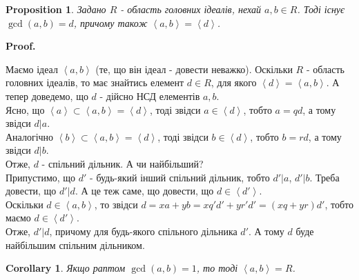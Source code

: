 \documentclass[a4paper, 10pt]{article}
\makeatletter
\theoremstyle{theoremdd}
\theoremstyle{theoremdd}
\newtheorem{definition}[theorem]{Definition}
\theoremstyle{theoremdd}
\theoremstyle{theoremdd}
\theoremstyle{theoremdd}
\newtheorem{proposition}[theorem]{Proposition}
\theoremstyle{theoremdd}
\theoremstyle{theoremdd}
\theoremstyle{theoremdd}
\newtheorem{corollary}[theorem]{Corollary}
\renewenvironment{proof}[1][Proof.\\]{\par
\pushQED{\hfill \qed}%
\normalfont \topsep6\p@\@plus6\p@\relax
\trivlist
\item\relax
{\bfseries
#1\@addpunct{.}}\hspace\labelsep\ignorespaces
}{%
\popQED\endtrivlist\@endpefalse
}
\makeatother
\begin{document}

\begin{proposition}
Задано $R$ - область головних ідеалів, нехай $a,b \in R$. Тоді існує $\gcd(a,b) = d$, причому також $\left<a,b\right> = \left<d\right>$.
\end{proposition}

\begin{proof}
Маємо ідеал $\left<a,b \right>$ (те, що він ідеал - довести неважко). Оскільки $R$ - область головних ідеалів, то має знайтись елемент $d \in R$, для якого $\left<d \right> = \left<a,b\right>$. А тепер доведемо, що $d$ - дійсно НСД елементів $a,b$.\\
Ясно, що $\left< a \right> \subset \left<a,b \right> = \left< d \right>$, тоді звідси $a \in \left< d \right>$, тобто $a = qd$, а тому звідси $d | a$.\\
Аналогічно $\left< b \right> \subset \left<a,b \right> = \left< d \right>$, тоді звідси $b \in \left< d \right>$, тобто $b = rd$, а тому звідси $d | b$.\\
Отже, $d$ - спільний дільник. А чи найбільший?\\
Припустимо, що $d'$ - будь-який інший спільний дільник, тобто $d' | a$, $d' | b$. Треба довести, що $d' | d$. А це теж саме, що довести, що $d \in \left<d' \right>$.\\
Оскільки $d \in \left< a,b \right>$, то звідси $d = xa + yb = xq'd' + yr'd' = (xq+yr)d'$, тобто маємо $d \in \left<d' \right>$.\\
Отже, $d' | d$, причому для будь-якого спільного дільника $d'$. А тому $d$ буде найбільшим спільним дільником.
\end{proof}

\begin{corollary}
Якщо раптом $\gcd(a,b) = 1$, то тоді $\left< a,b\right> = R$.
\end{corollary}

\end{document}
